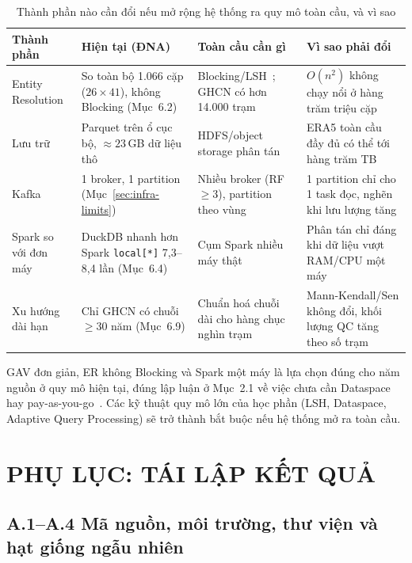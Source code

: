 \documentclass[12pt,a4paper]{report}
\begin{document}
\begin{table}[H]
\centering\footnotesize
\caption{Thành phần nào cần đổi nếu mở rộng hệ thống ra quy mô toàn cầu, và vì sao}
\label{tab:global-scale}
\begin{tabular}{@{}p{2.3cm}p{3.3cm}p{3.6cm}p{3.6cm}@{}}
\toprule
\textbf{Thành phần} & \textbf{Hiện tại (ĐNA)} & \textbf{Toàn cầu cần gì} & \textbf{Vì sao phải đổi} \\
\midrule
Entity Resolution & So toàn bộ 1.066 cặp ($26 \times 41$), không Blocking (Mục~6.2) & Blocking/LSH~\cite{gionis1999similarity}; GHCN có hơn 14.000 trạm & $O(n^2)$ không chạy nổi ở hàng trăm triệu cặp \\
Lưu trữ & Parquet trên ổ cục bộ, $\approx 23$\,GB dữ liệu thô & HDFS/object storage phân tán & ERA5 toàn cầu đầy đủ có thể tới hàng trăm TB \\
Kafka & 1 broker, 1 partition (Mục~\ref{sec:infra-limits}) & Nhiều broker (RF $\geq 3$), partition theo vùng & 1 partition chỉ cho 1 task đọc, nghẽn khi lưu lượng tăng \\
Spark so với đơn máy & DuckDB nhanh hơn Spark \texttt{local[*]} 7,3--8,4 lần (Mục~6.4) & Cụm Spark nhiều máy thật & Phân tán chỉ đáng khi dữ liệu vượt RAM/CPU một máy \\
Xu hướng dài hạn & Chỉ GHCN có chuỗi $\geq 30$ năm (Mục~6.9) & Chuẩn hoá chuỗi dài cho hàng chục nghìn trạm & Mann-Kendall/Sen không đổi, khối lượng QC tăng theo số trạm \\
\bottomrule
\end{tabular}
\end{table}

GAV đơn giản, ER không Blocking và Spark một máy là lựa chọn đúng cho năm nguồn ở quy mô hiện tại, đúng
lập luận ở Mục~2.1 về việc chưa cần Dataspace hay pay-as-you-go~\cite{halevy2006dataspace,dassarma2008payasyougo}.
Các kỹ thuật quy mô lớn của học phần (LSH, Dataspace, Adaptive Query Processing) sẽ trở thành bắt buộc
nếu hệ thống mở ra toàn cầu.

\chapter*{PHỤ LỤC: TÁI LẬP KẾT QUẢ}

\section*{A.1--A.4 Mã nguồn, môi trường, thư viện và hạt giống ngẫu nhiên}
\end{document}

